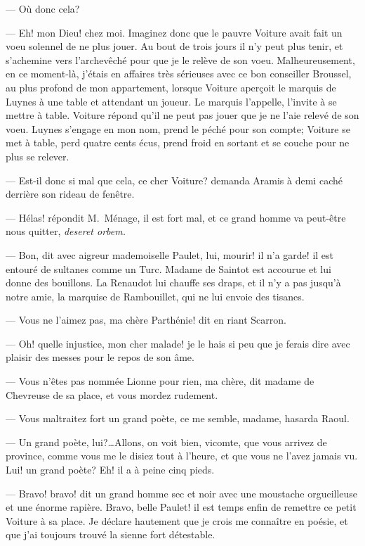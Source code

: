 — Où donc cela?

— Eh! mon Dieu! chez moi. Imaginez donc que le pauvre Voiture avait fait un voeu solennel de ne plus jouer. Au bout de trois jours il n'y peut plus tenir, et s'achemine vers l'archevêché pour que je le relève de son voeu. Malheureusement, en ce moment-là, j'étais en affaires très sérieuses avec ce bon conseiller Broussel, au plus profond de mon appartement, lorsque Voiture aperçoit le marquis de Luynes à une table et attendant un joueur. Le marquis l'appelle, l'invite à se mettre à table. Voiture répond qu'il ne peut pas jouer que je ne l'aie relevé de son voeu. Luynes s'engage en mon nom, prend le péché pour son compte; Voiture se met à table, perd quatre cents écus, prend froid en sortant et se couche pour ne plus se relever.

— Est-il donc si mal que cela, ce cher Voiture? demanda Aramis à demi caché derrière son rideau de fenêtre.

— Hélas! répondit M.~Ménage, il est fort mal, et ce grand homme va peut-être nous quitter, \textit{deseret orbem.}

— Bon, dit avec aigreur mademoiselle Paulet, lui, mourir! il n'a garde! il est entouré de sultanes comme un Turc. Madame de Saintot est accourue et lui donne des bouillons. La Renaudot lui chauffe ses draps, et il n'y a pas jusqu'à notre amie, la marquise de Rambouillet, qui ne lui envoie des tisanes.

— Vous ne l'aimez pas, ma chère Parthénie! dit en riant Scarron.

— Oh! quelle injustice, mon cher malade! je le hais si peu que je ferais dire avec plaisir des messes pour le repos de son âme.

— Vous n'êtes pas nommée Lionne pour rien, ma chère, dit madame de Chevreuse de sa place, et vous mordez rudement.

— Vous maltraitez fort un grand poète, ce me semble, madame, hasarda Raoul.

— Un grand poète, lui?\dots Allons, on voit bien, vicomte, que vous arrivez de province, comme vous me le disiez tout à l'heure, et que vous ne l'avez jamais vu. Lui! un grand poète? Eh! il a à peine cinq pieds.

— Bravo! bravo! dit un grand homme sec et noir avec une moustache orgueilleuse et une énorme rapière. Bravo, belle Paulet! il est temps enfin de remettre ce petit Voiture à sa place. Je déclare hautement que je crois me connaître en poésie, et que j'ai toujours trouvé la sienne fort détestable.

